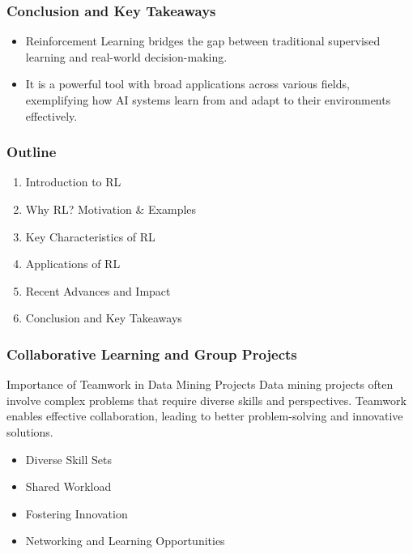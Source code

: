 \documentclass[aspectratio=169]{beamer}
\begin{document}
\begin{frame}[fragile]
    \frametitle{Conclusion and Key Takeaways}
    \begin{itemize}
        \item Reinforcement Learning bridges the gap between traditional supervised learning and real-world decision-making.
        \item It is a powerful tool with broad applications across various fields, exemplifying how AI systems learn from and adapt to their environments effectively.
    \end{itemize}
\end{frame}

\begin{frame}[fragile]
    \frametitle{Outline}
    \begin{enumerate}
        \item Introduction to RL  
        \item Why RL? Motivation \& Examples
        \item Key Characteristics of RL
        \item Applications of RL
        \item Recent Advances and Impact
        \item Conclusion and Key Takeaways
    \end{enumerate}
\end{frame}

\begin{frame}[fragile]
    \frametitle{Collaborative Learning and Group Projects}
    \begin{block}{Importance of Teamwork in Data Mining Projects}
        Data mining projects often involve complex problems that require diverse skills and perspectives. Teamwork enables effective collaboration, leading to better problem-solving and innovative solutions.
    \end{block}
    \begin{itemize}
        \item Diverse Skill Sets
        \item Shared Workload
        \item Fostering Innovation
        \item Networking and Learning Opportunities
    \end{itemize}
\end{frame}
\end{document}
